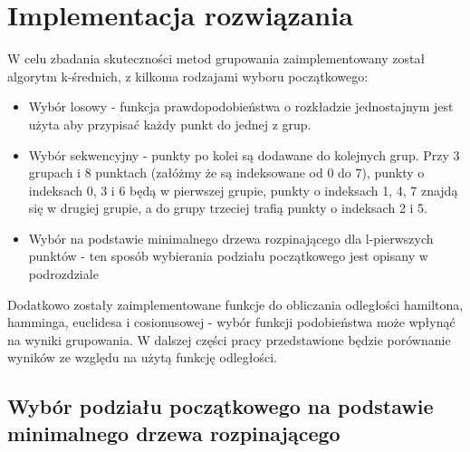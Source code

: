\documentclass{article}
\begin{document}
\newpage
\section{Implementacja rozwiązania}
W celu zbadania skuteczności metod grupowania zaimplementowany został algorytm k-średnich, z kilkoma rodzajami wyboru początkowego:
\begin{itemize}
	\item Wybór losowy - funkcja prawdopodobieństwa o rozkładzie jednostajnym jest użyta aby przypisać każdy punkt do jednej z grup.
	\item Wybór sekwencyjny - punkty po kolei są dodawane do kolejnych grup. Przy 3 grupach i 8 punktach (załóżmy że są indeksowane od 0 do 7), punkty o indeksach 0, 3 i 6 będą w pierwszej grupie, punkty o indeksach 1, 4, 7 znajdą się w drugiej grupie, a do grupy trzeciej trafią punkty o indeksach 2 i 5.
	\item Wybór na podstawie minimalnego drzewa rozpinającego dla l-pierwszych punktów - ten sposób wybierania podziału początkowego jest opisany w podrozdziale 
\end{itemize}

Dodatkowo zostały zaimplementowane funkcje do obliczania odległości hamiltona, hamminga, euclidesa i cosionusowej - wybór funkcji podobieństwa może wpłynąć na wyniki grupowania. W dalszej części pracy przedstawione będzie porównanie wyników ze względu na użytą funkcję odległości.

\subsection{Wybór podziału początkowego na podstawie minimalnego drzewa rozpinającego}
\end{document}
